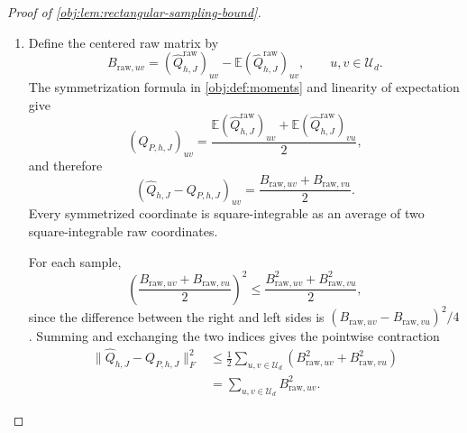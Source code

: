 \documentclass[11pt]{article}
\begin{document}
\begin{proof}[Proof of \cref{obj:lem:rectangular-sampling-bound}]
\begin{enumerate}
\item Define the centered raw matrix by
\[
B_{\mathrm{raw},uv}
=(\widehat Q^{\mathrm{raw}}_{h,J})_{uv}
 -\mathbb E(\widehat Q^{\mathrm{raw}}_{h,J})_{uv},
\qquad u,v\in\mathcal U_d.
\]
The symmetrization formula in \cref{obj:def:moments} and linearity of expectation give
\[
(Q_{P,h,J})_{uv}
=\frac{
 \mathbb E(\widehat Q^{\mathrm{raw}}_{h,J})_{uv}
 +\mathbb E(\widehat Q^{\mathrm{raw}}_{h,J})_{vu}}2,
\]
and therefore
\[
(\widehat Q_{h,J}-Q_{P,h,J})_{uv}
=\frac{B_{\mathrm{raw},uv}+B_{\mathrm{raw},vu}}2.
\]
Every symmetrized coordinate is square-integrable as an average of two square-integrable raw coordinates.

For each sample,
\[
\left(\frac{B_{\mathrm{raw},uv}+B_{\mathrm{raw},vu}}2\right)^2
\le\frac{B_{\mathrm{raw},uv}^2+B_{\mathrm{raw},vu}^2}{2},
\]
since the difference between the right and left sides is
\((B_{\mathrm{raw},uv}-B_{\mathrm{raw},vu})^2/4\). Summing and exchanging the two indices gives the pointwise contraction
\[
\begin{aligned}
\|\widehat Q_{h,J}-Q_{P,h,J}\|_F^2
&\le\frac12\sum_{u,v\in\mathcal U_d}
 \left(B_{\mathrm{raw},uv}^2+B_{\mathrm{raw},vu}^2\right)\\
&=\sum_{u,v\in\mathcal U_d}B_{\mathrm{raw},uv}^2.
\end{aligned}
\]


\end{enumerate}
\end{proof}
\end{document}
